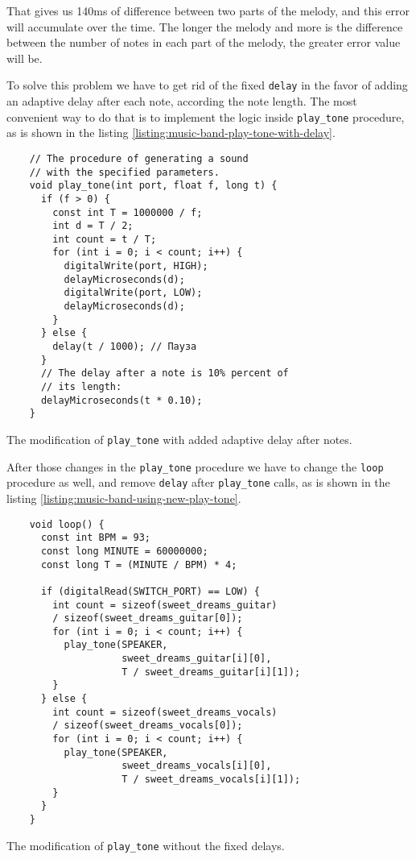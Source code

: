\documentclass[../sparc.tex]{subfiles}
\begin{document}
That gives us 140ms of difference between two parts of the melody, and this
error will accumulate over the time.  The longer the melody and more is the
difference between the number of notes in each part of the melody, the greater
error value will be.

To solve this problem we have to get rid of the fixed \texttt{delay} in the
favor of adding an adaptive delay after each note, according the note length.
The most convenient way to do that is to implement the logic inside
\texttt{play\_tone} procedure, as is shown in the listing
\ref{listing:music-band-play-tone-with-delay}.

\begin{listing}[H]
  \begin{verbatim}
    // The procedure of generating a sound
    // with the specified parameters.
    void play_tone(int port, float f, long t) {
      if (f > 0) {
        const int T = 1000000 / f;
        int d = T / 2;
        int count = t / T;
        for (int i = 0; i < count; i++) {
          digitalWrite(port, HIGH);
          delayMicroseconds(d);
          digitalWrite(port, LOW);
          delayMicroseconds(d);
        }
      } else {
        delay(t / 1000); // Пауза
      }
      // The delay after a note is 10% percent of
      // its length:
      delayMicroseconds(t * 0.10);
    }
  \end{verbatim}
  \caption{The modification of \texttt{play\_tone} with added adaptive delay
    after notes.}
  \label{listing:music-band-play-tone-with-delay}
\end{listing}

After those changes in the \texttt{play\_tone} procedure we have to change the
\texttt{loop} procedure as well, and remove \texttt{delay} after
\texttt{play\_tone} calls, as is shown in the listing
\ref{listing:music-band-using-new-play-tone}.

\begin{listing}[H]
  \begin{verbatim}
    void loop() {
      const int BPM = 93;
      const long MINUTE = 60000000;
      const long T = (MINUTE / BPM) * 4;

      if (digitalRead(SWITCH_PORT) == LOW) {
        int count = sizeof(sweet_dreams_guitar)
        / sizeof(sweet_dreams_guitar[0]);
        for (int i = 0; i < count; i++) {
          play_tone(SPEAKER,
                    sweet_dreams_guitar[i][0],
                    T / sweet_dreams_guitar[i][1]);
        }
      } else {
        int count = sizeof(sweet_dreams_vocals)
        / sizeof(sweet_dreams_vocals[0]);
        for (int i = 0; i < count; i++) {
          play_tone(SPEAKER,
                    sweet_dreams_vocals[i][0],
                    T / sweet_dreams_vocals[i][1]);
        }
      }
    }
  \end{verbatim}
  \caption{The modification of \texttt{play\_tone} without the fixed delays.}
  \label{listing:music-band-using-new-play-tone}
\end{listing}
\end{document}
